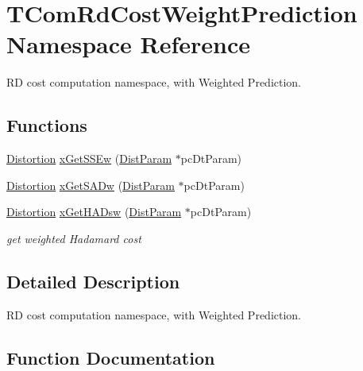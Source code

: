 \hypertarget{namespace_t_com_rd_cost_weight_prediction}{}\section{T\+Com\+Rd\+Cost\+Weight\+Prediction Namespace Reference}
\label{namespace_t_com_rd_cost_weight_prediction}


RD cost computation namespace, with Weighted Prediction.  


\subsection*{Functions}
\begin{DoxyCompactItemize}
\item 
\hyperlink{_type_def_8h_aed82b23ef6849d0bc3d95c92102d5b50}{Distortion} \hyperlink{namespace_t_com_rd_cost_weight_prediction_aacf668d0358c2086fa8139f8fd4ce7ac}{x\+Get\+S\+S\+Ew} (\hyperlink{class_dist_param}{Dist\+Param} $\ast$pc\+Dt\+Param)
\item 
\hyperlink{_type_def_8h_aed82b23ef6849d0bc3d95c92102d5b50}{Distortion} \hyperlink{namespace_t_com_rd_cost_weight_prediction_aa223cfb4f77a4441935103d5aebbcc89}{x\+Get\+S\+A\+Dw} (\hyperlink{class_dist_param}{Dist\+Param} $\ast$pc\+Dt\+Param)
\item 
\mbox{\label{namespace_t_com_rd_cost_weight_prediction_a98e0605fc5ad641ba2ef56da974634d2}} 
\hyperlink{_type_def_8h_aed82b23ef6849d0bc3d95c92102d5b50}{Distortion} \hyperlink{namespace_t_com_rd_cost_weight_prediction_a98e0605fc5ad641ba2ef56da974634d2}{x\+Get\+H\+A\+Dsw} (\hyperlink{class_dist_param}{Dist\+Param} $\ast$pc\+Dt\+Param)
\begin{DoxyCompactList}\small\item\em get weighted Hadamard cost \end{DoxyCompactList}\end{DoxyCompactItemize}


\subsection{Detailed Description}
RD cost computation namespace, with Weighted Prediction. 

\subsection{Function Documentation}
\mbox{\label{namespace_t_com_rd_cost_weight_prediction_aa223cfb4f77a4441935103d5aebbcc89}} 
